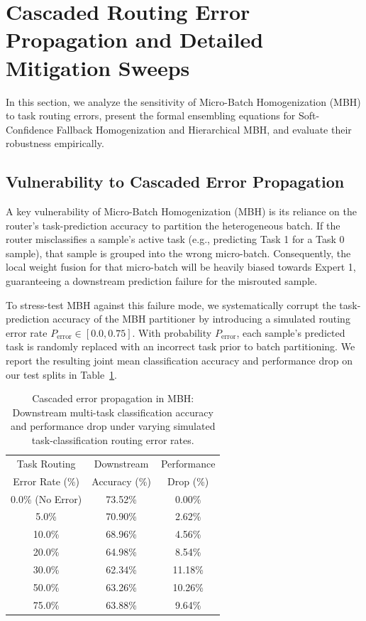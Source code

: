 \documentclass{article}
\theoremstyle{plain}
\theoremstyle{definition}
\theoremstyle{remark}
\begin{document}
\section{Cascaded Routing Error Propagation and Detailed Mitigation Sweeps}
\label{app:error_propagation_detailed}

In this section, we analyze the sensitivity of Micro-Batch Homogenization (MBH) to task routing errors, present the formal ensembling equations for Soft-Confidence Fallback Homogenization and Hierarchical MBH, and evaluate their robustness empirically.

\subsection{Vulnerability to Cascaded Error Propagation}
A key vulnerability of Micro-Batch Homogenization (MBH) is its reliance on the router's task-prediction accuracy to partition the heterogeneous batch. If the router misclassifies a sample's active task (e.g., predicting Task 1 for a Task 0 sample), that sample is grouped into the wrong micro-batch. Consequently, the local weight fusion for that micro-batch will be heavily biased towards Expert 1, guaranteeing a downstream prediction failure for the misrouted sample.

To stress-test MBH against this failure mode, we systematically corrupt the task-prediction accuracy of the MBH partitioner by introducing a simulated routing error rate $P_{\text{error}} \in [0.0, 0.75]$. With probability $P_{\text{error}}$, each sample's predicted task is randomly replaced with an incorrect task prior to batch partitioning. We report the resulting joint mean classification accuracy and performance drop on our test splits in Table~\ref{tab:error_propagation}.

\begin{table}[htbp]
\centering
\caption{Cascaded error propagation in MBH: Downstream multi-task classification accuracy and performance drop under varying simulated task-classification routing error rates.}
\label{tab:error_propagation}
\vskip 0.15in
\setlength{\tabcolsep}{4pt}
\begin{tabular}{ccc}
\toprule
Task Routing & Downstream & Performance \\
Error Rate (\%) & Accuracy (\%) & Drop (\%) \\
\midrule
0.0\% (No Error) & 73.52\% & 0.00\% \\
5.0\% & 70.90\% & 2.62\% \\
10.0\% & 68.96\% & 4.56\% \\
20.0\% & 64.98\% & 8.54\% \\
30.0\% & 62.34\% & 11.18\% \\
50.0\% & 63.26\% & 10.26\% \\
75.0\% & 63.88\% & 9.64\% \\
\bottomrule
\end{tabular}
\end{table}
\end{document}
